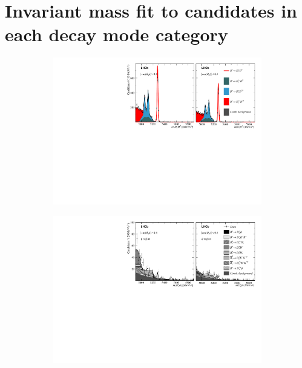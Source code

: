 \chapter{Invariant mass fit to \decay{\Bp}{\Dsp\phiz} candidates in each \Dsp decay mode category}
\label{ch:appendix_fits}



\begin{figure}[!h]
    \centering
    \begin{subfigure}[t]{1.0\textwidth}
        \centering
        \includegraphics[width=1.0\textwidth]{figs/Appendix_FitCategories/canvas_DsD0_merged_both_summed_splitHel_splitKKPi_s21_s21r1_s24_s26.pdf}\\
    \end{subfigure}
    \begin{subfigure}[t]{1.0\textwidth}
        \centering
        \includegraphics[width=1.0\textwidth]{figs/Appendix_FitCategories/canvas_DsPhi_merged_both_summed_splitHel_splitKKPi_s21_s21r1_s24_s26.pdf}\\

\end{subfigure}
\end{figure}
